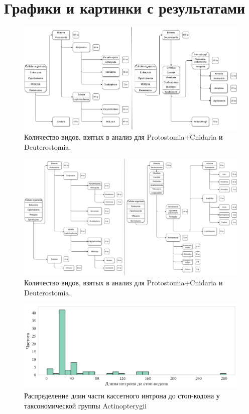 \newpage
\section{Графики и картинки с результатами}

\begin{figure}[h] %
    \centering
    \includegraphics[width=1.0\textwidth]{images/Tree_summary}
    \caption{Количество видов, взятых в анализ для Protostomia+Cnidaria и Deuterostomia.}
    \label{fig:tree_1}
\end{figure}

\newpage
\begin{figure}[h] %
    \centering
    \includegraphics[width=1.0\textwidth]{images/Tree_summary_v2}
    \caption{Количество видов, взятых в анализ для Protostomia+Cnidaria и Deuterostomia.}
    \label{fig:tree_2}
\end{figure}

\newpage
\begin{figure}[h] %
    \centering
    \includegraphics[width=1.0\textwidth]{images/Actinopterygii_intron_stop}
    \caption{Распределение длин части кассетного интрона до стоп-кодона у таксономической группы Actinopterygii}
    \label{fig:Actinopterygii_intron_stop}
\end{figure}

